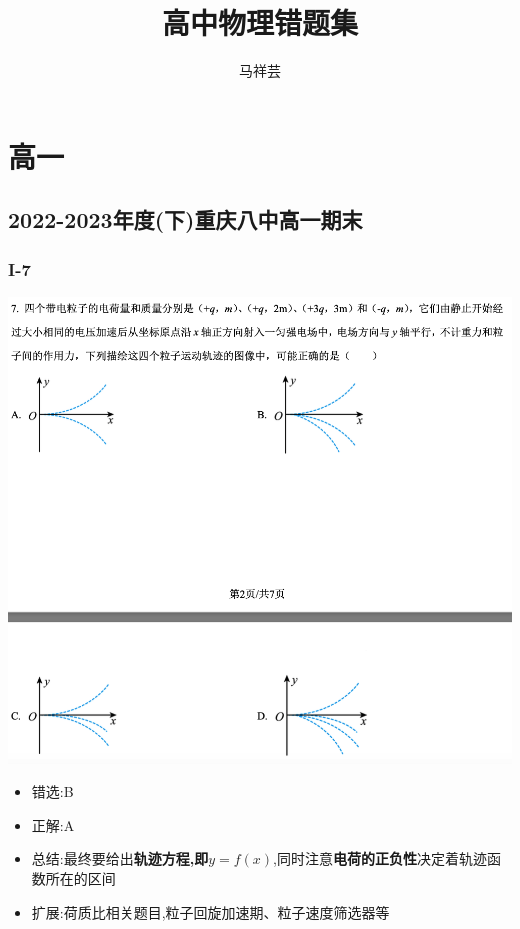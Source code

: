\documentclass{article}
\title{高中物理错题集}
\author{马祥芸}
\begin{document}
    \maketitle
    \tableofcontents
    \newpage

    \section{高一}  

    \subsection{2022-2023年度(下)重庆八中高一期末}

    \subsubsection{I-7}
    \includegraphics[width=50em,keepaspectratio]{./pictures/1.1-1.png}

    \begin{itemize}
        \item 错选:\quad B
        \item 正解:\quad A
        \item 总结:最终要给出\textbf{轨迹方程,即$ y = f(x) $},同时注意\textbf{电荷的正负性}决定着轨迹函数所在的区间
        \item 扩展:荷质比相关题目,粒子回旋加速期、粒子速度筛选器等
    \end{itemize}
\end{document}
